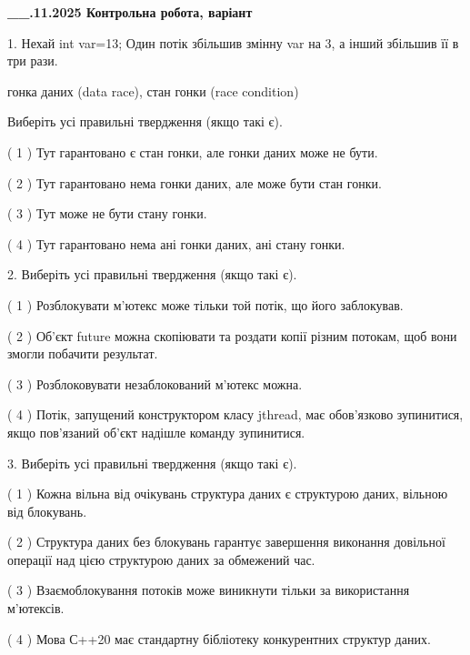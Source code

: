 \documentclass[12pt, ukrainian]{article}
\begin{document}
\newpage
\begin {large}

\textbf{\_\_.11.2025 Контрольна робота, варіант  }\par


{
1. Нехай int var=13; Один потік збільшив змінну var на 3, а інший збільшив її в три рази.

гонка даних (data race), стан гонки (race condition)

Виберіть усі правильні твердження (якщо такі є).\par
\vspace{2mm}
( 1 ) Тут гарантовано є стан гонки, але гонки даних може не бути.%

( 2 ) Тут гарантовано нема гонки даних, але може бути стан гонки.%

( 3 ) Тут може не бути стану гонки.%

( 4 ) Тут гарантовано нема ані гонки даних, ані стану гонки.%


2. Виберіть усі правильні твердження (якщо такі є).\par
\vspace{2mm}

( 1 ) Розблокувати м’ютекс може тільки той потік, що його заблокував.%

( 2 ) Об’єкт future можна скопіювати та роздати копії різним потокам, щоб вони змогли побачити результат.%

( 3 ) Розблоковувати незаблокований м’ютекс можна.%

( 4 ) Потік, запущений конструктором класу jthread, має обов’язково зупинитися, якщо пов’язаний об’єкт надішле команду зупинитися.%


3. Виберіть усі правильні твердження (якщо такі є).\par
\vspace{2mm}

( 1 ) Кожна вільна від очікувань структура даних є структурою даних, вільною від блокувань.%

( 2 ) Структура даних без блокувань гарантує завершення виконання довільної операції над цією структурою даних за обмежений час.%

( 3 ) Взаємоблокування потоків може виникнути тільки за використання м’ютексів.%

( 4 ) Мова С++20 має стандартну бібліотеку конкурентних структур даних.%


}
\end{large}
\end{document}
